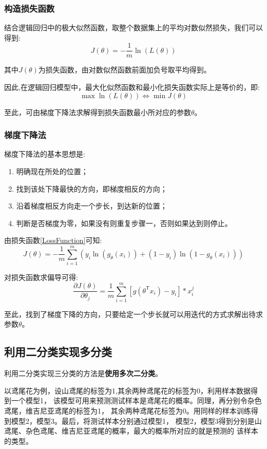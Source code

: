 \documentclass[UTF8]{article}
\begin{document}
\subsubsection{构造损失函数}
结合逻辑回归中的极大似然函数，取整个数据集上的平均对数似然损失，我们可以得到:
\begin{equation}
	J(\theta)=-\frac{1}{m}\ln(L(\theta)) \label{LossFunction}
\end{equation}
\par
其中$J(\theta)$为损失函数，由对数似然函数前面加负号取平均得到。
\par
因此,在逻辑回归模型中，最大化似然函数和最小化损失函数实际上是等价的，即:
\begin{equation}
	\max \ln(L(\theta))\Leftrightarrow \min J(\theta)
\end{equation}
\par
至此，可由梯度下降法求解得到损失函数最小所对应的参数$\theta$。
\subsubsection{梯度下降法}
梯度下降法的基本思想是:
\begin{enumerate}
	\item 明确现在所处的位置；
	\item 找到该处下降最快的方向，即梯度相反的方向；
	\item 沿着梯度相反方向走一个步长，到达新的位置；
	\item 判断是否梯度为零，如果没有则重复步骤一，否则如果达到则停止。
\end{enumerate}
\par
由损失函数\eqref{LossFunction}可知:
\begin{equation}
	J(\theta)=-\frac{1}{m}\sum_{i=1}^{m}(y_i\ln(g_\theta (x_i))+(1-y_i)\ln(1-g_\theta (x_i)))
\end{equation}
\par
对损失函数求偏导可得:
\begin{equation}
	\frac{\partial J(\theta)}{\partial \theta_j}=
	\frac{1}{m}\sum_{i=1}^{m}[g(\theta^\mathsf{T} x_i)-y_i]*x_i^j
\end{equation}
\par
至此，找到了梯度下降的方向，只要给定一个步长就可以用迭代的方式求解出待求参数$\theta$。

\subsection{利用二分类实现多分类}
利用二分类实现三分类的方法是\textbf{使用多次二分类}。\par
以鸢尾花为例，设山鸢尾的标签为1,其余两种鸢尾花的标签为0，利用样本数据得到一个模型1，
该模型可用来预测测试样本是鸢尾花的概率。同理，再分别令杂色鸢尾，维吉尼亚鸢尾的标签为1，
其余两种鸢尾花标签为0。用同样的样本训练得到模型2，模型3。最后，将测试样本分别通过模型1，
模型2，模型3得到分别是山鸢尾、杂色鸢尾、维吉尼亚鸢尾的概率，最大的概率所对应的就是预测的
该样本的类型。
\end{document}
